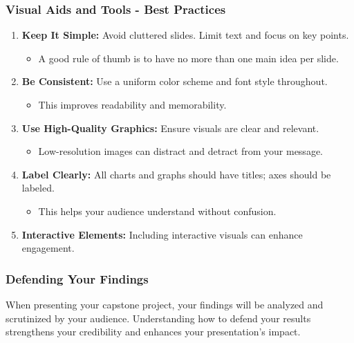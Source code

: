 \documentclass{beamer}
\begin{document}
\begin{frame}[fragile]
    \frametitle{Visual Aids and Tools - Best Practices}
    \begin{enumerate}
        \item \textbf{Keep It Simple:} Avoid cluttered slides. Limit text and focus on key points.
            \begin{itemize}
                \item A good rule of thumb is to have no more than one main idea per slide.
            \end{itemize}
        \item \textbf{Be Consistent:} Use a uniform color scheme and font style throughout.
            \begin{itemize}
                \item This improves readability and memorability.
            \end{itemize}
        \item \textbf{Use High-Quality Graphics:} Ensure visuals are clear and relevant.
            \begin{itemize}
                \item Low-resolution images can distract and detract from your message.
            \end{itemize}
        \item \textbf{Label Clearly:} All charts and graphs should have titles; axes should be labeled.
            \begin{itemize}
                \item This helps your audience understand without confusion.
            \end{itemize}
        \item \textbf{Interactive Elements:} Including interactive visuals can enhance engagement.
    \end{enumerate}
\end{frame}

\begin{frame}[fragile]
    \frametitle{Defending Your Findings}
    When presenting your capstone project, your findings will be analyzed and scrutinized by your audience. Understanding how to defend your results strengthens your credibility and enhances your presentation's impact.
\end{frame}
\end{document}
